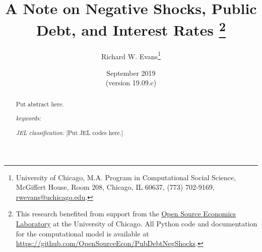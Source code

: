 \documentclass[letterpaper,12pt]{article}
\theoremstyle{definition}
\begin{document}
\begin{titlepage}
\title{A Note on Negative Shocks, Public Debt, and Interest Rates \thanks{This research benefited from support from the \href{https://www.oselab.org/}{Open Source Economics Laboratory} at the University of Chicago. All Python code and documentation for the computational model is available at \href{https://github.com/OpenSourceEcon/PubDebtNegShocks}{https://github.com/OpenSourceEcon/PubDebtNegShocks}.}
}
\author{
  Richard W. Evans\footnote{University of Chicago, M.A. Program in Computational Social Science, McGiffert House, Room 208, Chicago, IL 60637, (773) 702-9169, \href{mailto:rwevans@uchicago.edu}{rwevans@uchicago.edu}.}
  }
\date{{\footnotesize{September 2019}} \\
  {\scriptsize{(version 19.09.c)}}}
\maketitle
\vspace{-9mm}
\begin{abstract}
  Put abstract here.
  \vspace{3mm}

  \noindent\textit{keywords:}

  \vspace{3mm}

  \noindent\textit{JEL classification:} [Put JEL codes here.]

\end{abstract}
\thispagestyle{empty}
\end{titlepage}
\end{document}

